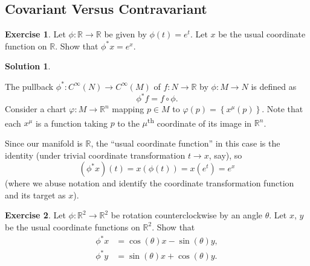 \documentclass[11pt, a4paper]{article}
\theoremstyle{definition}
\newtheorem{ex}{Exercise}[part]
\newtheorem{sol}{Solution}[part]
\begin{document}
\subsection{Covariant Versus Contravariant}

\begin{ex}

Let $\phi: \mathbb{R} \to \mathbb{R}$ be given by $\phi(t) = e^t$.
Let $x$ be the usual coordinate function on $\mathbb{R}$.
Show that $\phi^* x = e^x$.

\end{ex}

\begin{sol}\label{sol:pullbackexponential}

The pullback $\phi^*: C^\infty(N) \to C^\infty(M) $ of $f: N \to \mathbb{R}$ by $\phi: M \to N$ is defined as
\[
    \phi^*f = f \circ \phi. \tag{pullback of a function}\label{eq:pullbackfunction}
\]
Consider a chart $\varphi: M \to \mathbb{R}^n$ mapping $p \in M$ to $\varphi(p) = \left\{x^\mu(p)\right\}$.
Note that each $x^\mu$ is a function taking $p$ to the $\mu$\textsuperscript{th} coordinate of its image in $\mathbb{R}^n$.

Since our manifold is $\mathbb{R}$, the ``usual coordinate function'' in this case is the identity (under trivial coordinate transformation $t \to x$, say), so
\[
    (\phi^* x)(t) = x(\phi(t)) = x(e^t) = e^x
\]
(where we abuse notation and identify the coordinate transformation function and its target as $x$).

\end{sol}

\begin{ex}

Let $\phi: \mathbb{R}^2 \to \mathbb{R}^2$ be rotation counterclockwise by an angle $\theta$. Let $x$, $y$ be the usual coordinate functions on $\mathbb{R}^2$. Show that
\begin{align*}
    \phi^* x &= \cos(\theta) x - \sin(\theta) y, \\
    \phi^* y &= \sin(\theta) x + \cos(\theta) y.
\end{align*}

\end{ex}
\end{document}
